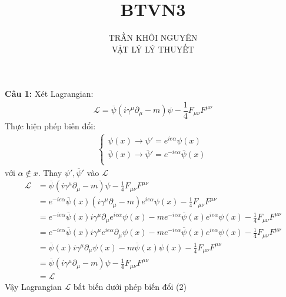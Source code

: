 \documentclass{article}
\title{\Huge{BTVN3}}
\newcommand{\f}[2]{\dfrac{#1}{#2}}
\begin{document}
\setlength{\parindent}{20pt}
\newpage
\author{TRẦN KHÔI NGUYÊN \\ VẬT LÝ LÝ THUYẾT}
\maketitle
\textbf{Câu 1:} Xét Lagrangian:
\begin{align}
	\mathcal{L} = \overline{\psi} (i \gamma^{\mu} \partial_{\mu} - m ) \psi - \f{1}{4} F_{\mu\nu}F^{\mu\nu}
\end{align}
Thực hiện phép biến đổi:
\begin{align}
	\begin{cases}
		\psi(x)\rightarrow\psi'=e^{ie\alpha}\psi(x)                                   \\
		\overline{\psi}(x)\rightarrow\overline{\psi}'=e^{-ie\alpha}\overline{\psi}(x) \\
	\end{cases}
\end{align}
với $\alpha \notin x$. Thay $\psi', \overline{\psi}' $ vào $\mathcal{L}$
\begin{align*}
	\mathcal{L} & =\overline{\psi}(i\gamma^\mu\partial_\mu-m)\psi-\frac{1}{4}F_{\mu\nu}F^{\mu\nu}                                                                                 \\
	            & =e^{-ie\alpha}\overline{\psi}(x)(i\gamma^\mu\partial_\mu-m)e^{ie\alpha}\psi(x)-\frac{1}{4}F_{\mu\nu}F^{\mu\nu}                                                  \\
	            & =e^{-ie\alpha}\overline{\psi}(x)i\gamma^\mu\partial_\mu e^{ie\alpha}\psi(x)-me^{-ie\alpha}\overline{\psi}(x)e^{ie\alpha}\psi(x)-\frac{1}{4}F_{\mu\nu}F^{\mu\nu} \\
	            & =e^{-ie\alpha}\overline{\psi}(x)i\gamma^\mu e^{ie\alpha}\partial_\mu\psi(x)-me^{-ie\alpha}\overline{\psi}(x)e^{ie\alpha}\psi(x)-\frac{1}{4}F_{\mu\nu}F^{\mu\nu} \\
	            & =\overline{\psi}(x)i\gamma^\mu\partial_\mu\psi(x)-m\overline{\psi}(x)\psi(x)-\frac{1}{4}F_{\mu\nu}F^{\mu\nu}                                                    \\
	            & =\overline{\psi}(i\gamma^\mu\partial_\mu-m)\psi-\frac{1}{4}F_{\mu\nu}F^{\mu\nu}                                                                                 \\
	            & =\mathcal{L}
\end{align*}
Vậy Lagrangian $\mathcal{L}$ bất biến dưới phép biến đổi (2)
\end{document}
